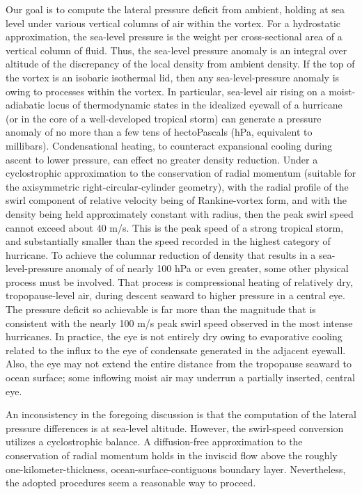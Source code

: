 \documentclass{article}
\begin{document}
Our goal is to compute the lateral pressure deficit from ambient, holding at sea level under various vertical columns of air within the vortex. For a hydrostatic approximation, the sea-level pressure is the weight per cross-sectional area of a vertical column of fluid. Thus, the sea-level pressure anomaly is an integral over altitude of the discrepancy of the local density from ambient density. If the top of the vortex is an isobaric isothermal lid, then any sea-level-pressure anomaly is owing to processes within the vortex.
In particular, sea-level air rising on a moist-adiabatic locus of thermodynamic states in the idealized eyewall of a hurricane (or in the core of a well-developed tropical storm) can generate a pressure anomaly of no more than a few tens of hectoPascals (hPa, equivalent to millibars). Condensational heating, to counteract expansional cooling during ascent to lower pressure, can effect no greater density reduction. Under a cyclostrophic approximation to the conservation of radial momentum (suitable for the axisymmetric right-circular-cylinder geometry), with the radial profile of the swirl component of relative velocity being of Rankine-vortex form, and with the density being held approximately constant with radius, then the peak swirl speed cannot exceed about 40 m/s. This is the peak speed of a strong tropical storm, and substantially smaller than the speed recorded in the highest category of hurricane. 
To achieve the columnar reduction of density that results in a sea-level-pressure anomaly of of nearly 100 hPa or even greater, some other physical process must be involved. That process is compressional heating of relatively dry, tropopause-level air, during descent seaward to higher pressure in a central eye.  The pressure deficit so achievable is far more than the magnitude that is consistent with the nearly 100 m/s peak swirl speed observed in the most intense hurricanes. In practice, the eye is not entirely dry owing to evaporative cooling related to the influx to the eye of condensate generated in the adjacent eyewall. Also, the eye may not extend the entire distance from the tropopause seaward to ocean surface; some inflowing moist air may underrun a partially inserted, central eye.

An inconsistency in the foregoing discussion is that the computation of the lateral pressure differences is at sea-level altitude. However, the swirl-speed conversion utilizes a cyclostrophic balance. A diffusion-free approximation to the conservation of radial momentum holds in the inviscid flow above the roughly one-kilometer-thickness, ocean-surface-contiguous boundary layer. Nevertheless, the adopted procedures seem a reasonable way to proceed. 
\end{document}
